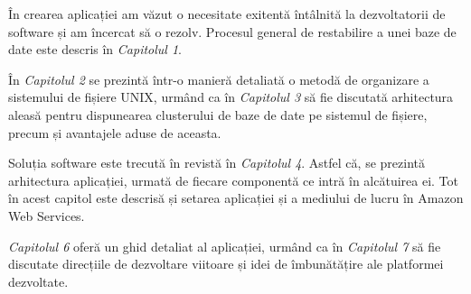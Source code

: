 În crearea aplicației am văzut o necesitate exitentă întâlnită la dezvoltatorii de software și am încercat să o rezolv. Procesul general de restabilire a unei baze de date este descris în \textit{Capitolul 1}.
\par
În \textit{Capitolul 2} se prezintă într-o manieră detaliată o metodă de organizare a sistemului de fișiere UNIX, urmând ca în \textit{Capitolul 3} să fie discutată arhitectura aleasă pentru dispunearea clusterului de baze de date pe sistemul de fișiere, precum și avantajele aduse de aceasta.
\par
Soluția software este trecută în revistă în \textit{Capitolul 4}. Astfel că, se prezintă arhitectura aplicației, urmată de fiecare componentă ce intră în alcătuirea ei. Tot în acest capitol este descrisă și setarea aplicației și a mediului de lucru în Amazon Web Services.
\par
\textit{Capitolul 6} oferă un ghid detaliat al aplicației, urmând ca în \textit{Capitolul 7} să fie discutate direcțiile de dezvoltare viitoare și idei de îmbunătățire ale platformei dezvoltate.
